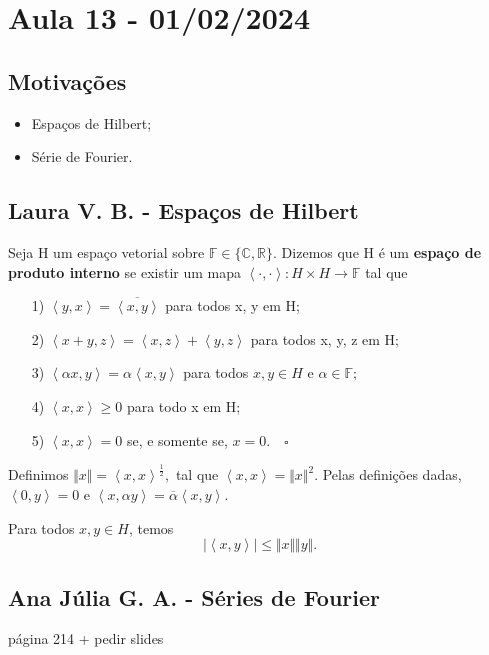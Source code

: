 \documentclass[measure_theory.tex]{subfiles}
\begin{document}
\section{Aula 13 - 01/02/2024}
\subsection{Motivações}
\begin{itemize}
	\item Espaços de Hilbert;
	\item Série de Fourier.
\end{itemize}
\subsection{Laura V. B. - Espaços de Hilbert}
\begin{def*}
	Seja H um espaço vetorial sobre \(\mathbb{F}\in\{\mathbb{C}, \mathbb{R}\}\). Dizemos que H é um \textbf{espaço de produto interno} se existir um mapa
	\(\left< \cdot , \cdot  \right>:H \times H\rightarrow \mathbb{F}\) tal que
	\begin{itemize}
		\item[1)] \(\left< y, x \right> = \overline{\left< x, y \right>}\) para todos x, y em H;
		\item[2)] \(\left< x + y, z \right> = \left< x, z \right> + \left< y, z \right>\) para todos x, y, z em H;
		\item[3)] \(\left< \alpha x, y \right> = \alpha \left< x, y \right>\) para todos \(x, y\in H\) e \(\alpha \in \mathbb{F};\)
		\item[4)] \(\left< x, x \right> \geq 0\) para todo x em H;
		\item[5)] \(\left< x, x \right> = 0\) se, e somente se, \(x=0.\quad \square\)
	\end{itemize}
\end{def*}
Definimos \(\Vert x \Vert = \left< x, x \right>^{\frac{1}{2}},\) tal que \(\left< x, x \right> = \Vert x \Vert^{2}.\) Pelas definições dadas, \(\left< 0, y \right> = 0\) e
\(\left< x, \alpha y \right> = \overline{\alpha }\left< x, y \right>.\)

\hypertarget{cauchy_schwarz}{
	\begin{theorem*}
		Para todos \(x, y\in H\), temos
		\[
			|\left< x, y \right>|\leq \Vert x \Vert \Vert y \Vert.
		\]
	\end{theorem*}}

\subsection{Ana Júlia G. A. - Séries de Fourier}
página 214 + pedir slides
\end{document}
